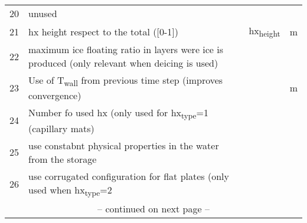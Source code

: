 \documentclass[english]{SPFReport}
\begin{document}
\begin{tabular}{| l |  m{8cm} | l | l |}
20 & unused &&\\
 21 & hx height respect to the total ([0-1])& \si{hx_{height}} & m\\ 
 22 & maximum ice floating ratio in layers were ice is produced (only relevant when deicing is used) & &\\
 23 & Use of \si{T_{wall}} from previous time step (improves convergence) & &m\\
 24 & Number fo used hx (only used for \si{hx_{type}}=1 (capillary mats) &&\\
 25 & use constabnt physical properties in the water from the storage && \\
 26 & use corrugated configuration for flat plates (only used when \si{hx_{type}}=2 &&\\
 \multicolumn{4}{c}{\small -- continued on next page --} \\
\end{tabular}

\end{document}

